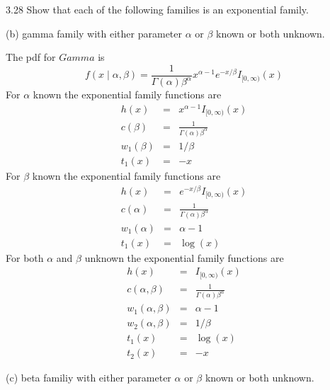 \documentclass[12pt]{article}
\begin{document}
3.28
Show that each of the following families is an exponential family.

\bigskip
\noindent
(b) gamma family with either parameter $\alpha$ or $\beta$
known or both unknown.

\bigskip
\noindent
The pdf for $Gamma$ is
$$f(x\mid\alpha,\beta)=\frac{1}{\Gamma(\alpha)\beta^\alpha}
x^{\alpha-1}e^{-x/\beta}I_{[0,\infty)}(x)$$
%
For $\alpha$ known the exponential family functions are
\begin{eqnarray*}
h(x)&=&x^{\alpha-1}I_{[0,\infty)}(x)\\
c(\beta)&=&\frac{1}{\Gamma(\alpha)\beta^\alpha}\\
w_1(\beta)&=&1/\beta\\
t_1(x)&=&-x
\end{eqnarray*}
%
For $\beta$ known the exponential family functions are
\begin{eqnarray*}
h(x)&=&e^{-x/\beta}I_{[0,\infty)}(x)\\
c(\alpha)&=&\frac{1}{\Gamma(\alpha)\beta^\alpha}\\
w_1(\alpha)&=&\alpha-1\\
t_1(x)&=&\log(x)
\end{eqnarray*}
%
For both $\alpha$ and $\beta$ unknown the exponential
family functions are
\begin{eqnarray*}
h(x)&=&I_{[0,\infty)}(x)\\
c(\alpha,\beta)&=&\frac{1}{\Gamma(\alpha)\beta^\alpha}\\
w_1(\alpha,\beta)&=&\alpha-1\\
w_2(\alpha,\beta)&=&1/\beta\\
t_1(x)&=&\log(x)\\
t_2(x)&=&-x
\end{eqnarray*}

\bigskip
\noindent
(c) beta familiy with either parameter $\alpha$ or $\beta$
known or both unknown.
\end{document}
